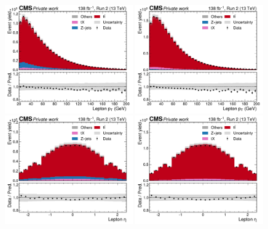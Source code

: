 \begin{figure}[!hp]
    \centering
    \includegraphics[width=0.49\textwidth]{figures/ah/controlplots/ReqMET/sf/lep_pt_ReqMET_sf.pdf}
    \hfill
    \includegraphics[width=0.49\textwidth]{figures/ah/controlplots/ReqMET/em/lep_pt_ReqMET_em.pdf}
    \includegraphics[width=0.49\textwidth]{figures/ah/controlplots/ReqMET/sf/lep_eta_ReqMET_sf.pdf}
    \hfill
    \includegraphics[width=0.49\textwidth]{figures/ah/controlplots/ReqMET/em/lep_eta_ReqMET_em.pdf}

\end{figure}
